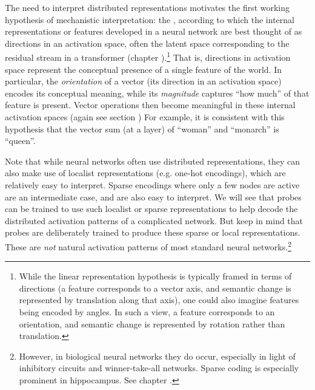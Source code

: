 The need to interpret distributed representations motivates the first working
hypothesis of mechanistic interpretation: the , according to which the internal representations or features
developed in a neural network are best thought of as directions in an
activation space, often the latent space corresponding to the residual stream
in a transformer (chapter ).\footnote{While the linear representation hypothesis is typically framed in terms of directions (a feature corresponds to a vector axis, and semantic change is represented by translation along that axis), one could also imagine features being encoded by angles. In such a view, a feature corresponds to an orientation, and semantic change is represented by rotation rather than translation.} That is, directions in
activation space represent the conceptual  presence of a single feature of the
world. In particular, the  \emph{orientation} of a vector (its direction in an
activation space) encodes its conceptual meaning, while its \emph{magnitude}
captures ``how much'' of that feature is present. Vector operations then become
meaningful in these internal activation spaces (again see section
)  For example, it is consistent with this
hypothesis that the vector sum (at a layer) of ``woman'' and ``monarch'' is
``queen''.

Note that while neural networks often use distributed representations, they can
also make use of localist representations (e.g. one-hot encodings), which are
relatively easy to interpret. Sparse encodings where only a few nodes are active are
an intermediate case, and are also easy to interpret. We will see that probes
can be trained to use such localist or sparse representations to help decode the
distributed activation patterns of a complicated network. But keep in mind that probes are deliberately trained to produce these sparse or local representations. These are \emph{not} natural activation patterns of most standard neural networks.\footnote{However, in biological neural networks they do occur, especially in light of inhibitory circuits and winner-take-all networks. Sparse coding is especially prominent in hippocampus. See chapter .}

